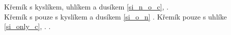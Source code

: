 \documentclass[
  digital, %
  table,   %
  lof,     %
  lot,     %
]{fithesis3}
\begin{document}
Křemík s kyslíkem, uhlíkem a dusíkem \ref{si_n_o_c}, \cite{Wagler2014}.\\%
Křemík s pouze s kyslíkem a dusíkem \ref{si_o_n} \cite{Wagler2014} .
Křemík pouze s uhlíke \ref{si_only_c}, \cite{A901953G}.
 \cite{Wagler2014}.
 \begin{figure}
 \begin{center}

\end{center}
\end{figure}
\end{document}
